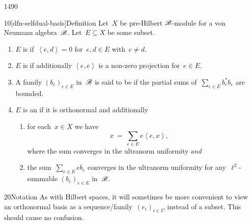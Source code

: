\begin{parsec}{1490}%
\begin{point}{10}[dfn-selfdual-basis]{Definition}
    Let~$X$ be pre-Hilbert $\mathscr{B}$-module
        for a von Neumann algebra~$\mathscr{B}$.
    Let~$E \subseteq X$ be some subset.
    \begin{enumerate}
        \item $E$ is  if~$\left<e,d\right> = 0$
            for~$e,d \in E$ with~$e \neq d$.
        \item $E$ is  if additionally
                    $\left<e,e\right>$ is a non-zero projection
                    for~$e \in E$.
        \item A family $(b_e)_{e \in E}$ in~$\mathscr{B}$
                is said to be 
                if the partial sums of~$\sum_{e \in E} b_e^*b_e$
                are bounded.
        \item $E$ is an  if
                it is orthonormal and additionally
            \begin{enumerate}
                \item for each~$x \in X$ we have
                    \begin{equation*}
                        x \ =\  \sum_{e \in E} e\left<e,x\right>,
                    \end{equation*}
                    where the sum converges in the ultranorm uniformity
                    \emph{and}
                \item  the sum~$\sum_{e \in E} eb_e$
                        converges in the ultranorm uniformity
                    for any~$\ell^2$-summable $(b_e)_{e \in E}$
                        in~$\mathscr{B}$.
            \end{enumerate}
    \end{enumerate}
\begin{point}{20}{Notation}%
As with Hilbert spaces, it will sometimes be more convenient
    to view an orthonormal basis as a sequence/family~$(e_i)_{i \in I}$,
    instead of a subset. This should cause no confusion.
\end{point}

\end{point}
\end{parsec}
